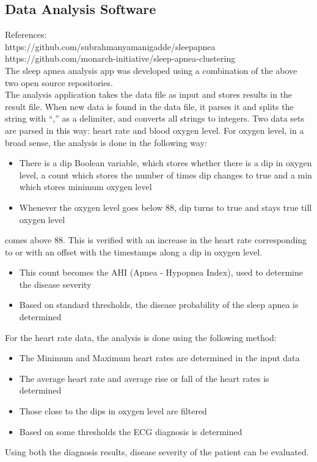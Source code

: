\documentclass[10pt,journal,compsoc]{IEEEtran}
\begin{document}
\subsection{Data Analysis Software}
References: \\
https://github.com/subrahmanyamanigadde/sleepapnea \\
https://github.com/monarch-initiative/sleep-apnea-clustering \\
The sleep apnea analysis app was developed using a combination of the above two open source repositories.  \\
The analysis application takes the data file as input and stores results in the result file. When new data is found in the data file, it parses it and splits the string with “,” as a delimiter, and converts all strings to integers. Two data sets are parsed in this way: heart rate and blood oxygen level. For oxygen level, in a broad sense, the analysis is done in the following way: 
\begin{itemize}
\item There is a dip Boolean variable, which stores whether there is a dip in oxygen level, a count which stores the number of times dip changes to true and a min which stores minimum oxygen level 
\item Whenever the oxygen level goes below 88, dip turns to true and stays true till oxygen level 
\end{itemize}
comes above 88. This is verified with an increase in the heart rate corresponding to or with an offset with the timestamps along a dip in oxygen level.
\begin{itemize}
\item This count becomes the AHI (Apnea - Hypopnea Index), used to determine the disease severity
\item Based on standard thresholds, the disease probability of the sleep apnea is determined 
\end{itemize}
For the heart rate data, the analysis is done using the following method:
\begin{itemize}
\item The Minimum and Maximum heart rates are determined in the input data
\item The average heart rate and average rise or fall of the heart rates is determined
\item Those close to the dips in oxygen level are filtered
\item Based on some thresholds the ECG diagnosis is determined
\end{itemize}
Using both the diagnosis results, disease severity of the patient can be evaluated.
\end{document}
